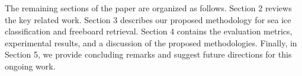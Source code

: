 


The remaining sections of the paper are organized as follows. Section 2 reviews the key related work. Section 3 describes our proposed methodology for sea ice classification and freeboard retrieval. Section 4 contains the evaluation metrics, experimental results, and a discussion of the proposed methodologies. Finally, in Section 5, we provide concluding remarks and suggest future directions for this ongoing work.

